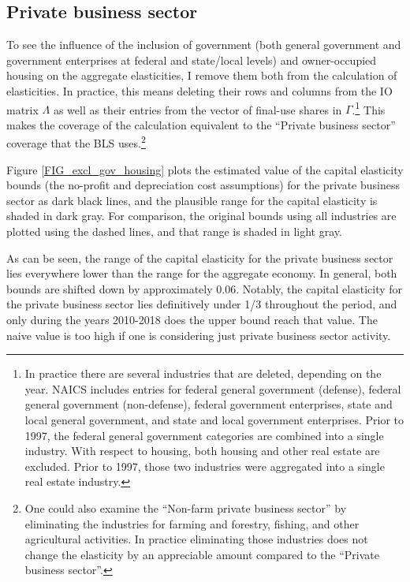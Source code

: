\documentclass[11pt]{article}
\begin{document}
\subsection{Private business sector}
To see the influence of the inclusion of government (both general government and government enterprises at federal and state/local levels) and owner-occupied housing on the aggregate elasticities, I remove them both from the calculation of elasticities. In practice, this means deleting their rows and columns from the IO matrix $\Lambda$ as well as their entries from the vector of final-use shares in $\Gamma$.\footnote{In practice there are several industries that are deleted, depending on the year. NAICS includes entries for federal general government (defense), federal general government (non-defense), federal government enterprises, state and local general government, and state and local government enterprises. Prior to 1997, the federal general government categories are combined into a single industry. With respect to housing, both housing and other real estate are excluded. Prior to 1997, those two industries were aggregated into a single real estate industry.} This makes the coverage of the calculation equivalent to the ``Private business sector'' coverage that the BLS uses.\footnote{One could also examine the ``Non-farm private business sector'' by eliminating the industries for farming and forestry, fishing, and other agricultural activities. In practice eliminating those industries does not change the elasticity by an appreciable amount compared to the ``Private business sector''.} 

Figure \ref{FIG_excl_gov_housing} plots the estimated value of the capital elasticity bounds (the no-profit and depreciation cost assumptions) for the private business sector as dark black lines, and the plausible range for the capital elasticity is shaded in dark gray. For comparison, the original bounds using all industries are plotted using the dashed lines, and that range is shaded in light gray. 

As can be seen, the range of the capital elasticity for the private business sector lies everywhere lower than the range for the aggregate economy. In general, both bounds are shifted down by approximately 0.06. Notably, the capital elasticity for the private business sector lies definitively under 1/3 throughout the period, and only during the years 2010-2018 does the upper bound reach that value. The naive value is too high if one is considering just private business sector activity.  
\end{document}
